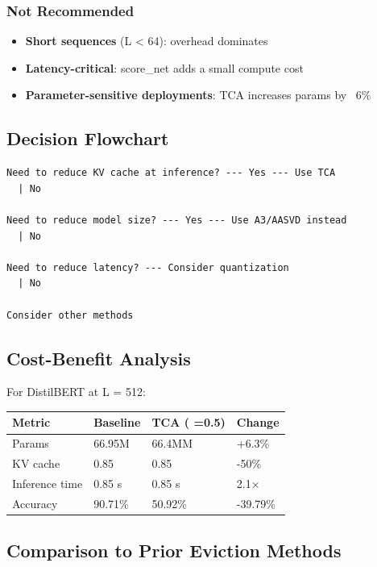 \subsubsection{Not Recommended}
\begin{itemize}
\item \textbf{Short sequences} (L \textless{} 64): overhead dominates
\item \textbf{Latency-critical}: score\_net adds a small compute cost
\item \textbf{Parameter-sensitive deployments}: TCA increases params by ~6\%

\end{itemize}
\subsection{Decision Flowchart}

\begin{lstlisting}
Need to reduce KV cache at inference? --- Yes --- Use TCA
  | No
   
Need to reduce model size? --- Yes --- Use A3/AASVD instead
  | No
   
Need to reduce latency? --- Consider quantization
  | No
   
Consider other methods
\end{lstlisting}

\subsection{Cost-Benefit Analysis}

For DistilBERT at L = 512:

\begin{table}[H]
\centering
\small
\begin{tabular}{llll}
\toprule
\textbf{Metric} & \textbf{Baseline} & \textbf{TCA ( =0.5)} & \textbf{Change} \\
\midrule
Params & 66.95M & 66.4MM & +6.3\% \\
KV cache & 0.85 & 0.85 & -50\% \\
Inference time & 0.85 s & 0.85 s & 2.1$\times$ \\
Accuracy & 90.71\% & 50.92\% & -39.79\% \\
\bottomrule
\end{tabular}
\end{table}

\subsection{Comparison to Prior Eviction Methods}

